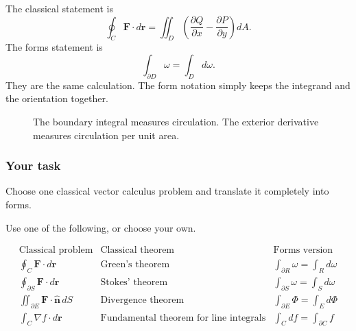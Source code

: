 The classical statement is
\[
    \oint_C \mathbf F\cdot d\mathbf r
    =
    \iint_D
    \left(
        \frac{\partial Q}{\partial x}
        -
        \frac{\partial P}{\partial y}
    \right)
    dA.
\]
The forms statement is
\[
    \int_{\partial D}\omega=\int_D d\omega.
\]
They are the same calculation.  The form notation simply keeps the integrand and the
orientation together.

\begin{figure}[h]
\centering
{}
\caption{The boundary integral measures circulation.  The exterior derivative measures
circulation per unit area.}
\end{figure}

\subsubsection*{Your task}

Choose one classical vector calculus problem and translate it completely into forms.

Use one of the following, or choose your own.

\[
\begin{array}{c|c|c}
\text{Classical problem} & \text{Classical theorem} & \text{Forms version} \\ \hline
\oint_C \mathbf F\cdot d\mathbf r
&
\text{Green's theorem}
&
\int_{\partial R}\omega=\int_R d\omega
\\[1mm]
\oint_{\partial S}\mathbf F\cdot d\mathbf r
&
\text{Stokes' theorem}
&
\int_{\partial S}\omega=\int_S d\omega
\\[1mm]
\iint_{\partial E}\mathbf F\cdot\widehat{\mathbf n}\,dS
&
\text{Divergence theorem}
&
\int_{\partial E}\Phi=\int_E d\Phi
\\[1mm]
\int_C \nabla f\cdot d\mathbf r
&
\text{Fundamental theorem for line integrals}
&
\int_C df=\int_{\partial C}f
\end{array}
\]

